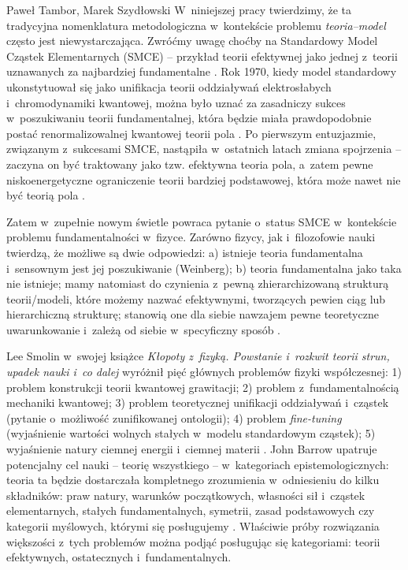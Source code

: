 \begin{artplenv}{Paweł Tambor, Marek Szydłowski}
W~niniejszej pracy twierdzimy, że ta tradycyjna nomenklatura metodologiczna w~kontekście problemu \textit{teoria–model} często jest niewystarczająca. Zwróćmy uwagę choćby na Standardowy Model Cząstek Elementarnych (SMCE) -- przykład teorii efektywnej jako jednej z~teorii uznawanych za najbardziej fundamentalne
\parencite[][]{kaplan_effective_1999}. %
 Rok 1970, kiedy model standardowy ukonstytuował się jako unifikacja teorii oddziaływań elektrosłabych i~chromodynamiki kwantowej, można było uznać za zasadniczy sukces w~poszukiwaniu teorii fundamentalnej, która będzie miała prawdopodobnie postać renormalizowalnej kwantowej teorii pola 
\parencite[][]{weinberg_newtonianism_1987}. %
 Po pierwszym entuzjazmie, związanym z~sukcesami SMCE, nastąpiła w~ostatnich latach zmiana spojrzenia -- zaczyna on być traktowany jako tzw. efektywna teoria pola, a~zatem pewne niskoenergetyczne ograniczenie teorii bardziej podstawowej, która może nawet nie być teorią pola 
\parencites[][]{hartmann_effective_2001}[por.][]{weinberg_what_1997}.%


Zatem w~zupełnie nowym świetle powraca pytanie o~status SMCE w~kontekście problemu fundamentalności w~fizyce. Zarówno fizycy, jak i~filozofowie nauki twierdzą, że możliwe są dwie odpowiedzi: a) istnieje teoria fundamentalna i~sensownym jest jej poszukiwanie (Weinberg); b) teoria fundamentalna jako taka nie istnieje; mamy natomiast do czynienia z~pewną zhierarchizowaną strukturą teorii/modeli, które możemy nazwać efektywnymi, tworzących pewien ciąg lub hierarchiczną strukturę; stanowią one dla siebie nawzajem pewne teoretyczne uwarunkowanie i~zależą od siebie w~specyficzny sposób
\parencite[][]{cao_conceptual_1993}.%


Lee Smolin w~swojej książce \textit{Kłopoty z~fizyką. Powstanie i~rozkwit teorii strun, upadek nauki i~co dalej} wyróżnił pięć głównych problemów fizyki współczesnej: 1) problem konstrukcji teorii kwantowej grawitacji; 2) problem z~fundamentalnością mechaniki kwantowej; 3) problem teoretycznej unifikacji oddziaływań i~cząstek (pytanie o~możliwość zunifikowanej ontologii); 4) problem \textit{fine-tuning} (wyjaśnienie wartości wolnych stałych w~modelu standardowym cząstek); 5) wyjaśnienie natury ciemnej energii i~ciemnej materii
\parencite[][]{smolin_klopoty_2008}. %
 John Barrow upatruje potencjalny cel nauki -- teorię wszystkiego -- w~kategoriach epistemologicznych: teoria ta będzie dostarczała kompletnego zrozumienia w~odniesieniu do kilku składników: praw natury, warunków początkowych, własności sił i~cząstek elementarnych, stałych fundamentalnych, symetrii, zasad podstawowych czy kategorii myślowych, którymi się posługujemy 
\parencite[][s.~4]{barrow_new_2007}. %
 Właściwie próby rozwiązania większości z~tych problemów można podjąć posługując się kategoriami: teorii efektywnych, ostatecznych i~fundamentalnych.


\end{artplenv}
